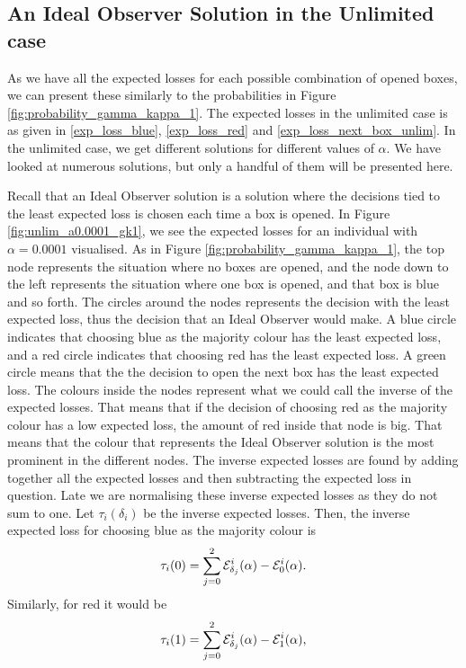 \subsection{An Ideal Observer Solution in the Unlimited case}

As we have all the expected losses for each possible combination of opened boxes, we can present these similarly to the probabilities in Figure \ref{fig:probability_gamma_kappa_1}. 
The expected losses in the unlimited case is as given in \eqref{exp_loss_blue}, \eqref{exp_loss_red} and \eqref{exp_loss_next_box_unlim}. In the unlimited case, we get different solutions for different values of $\alpha$. We have looked at numerous solutions, but only a handful of them will be presented here. 

Recall that an Ideal Observer solution is a solution where the decisions tied to the least expected loss is chosen each time a box is opened. In Figure \ref{fig:unlim_a0.0001_gk1}, we see the expected losses for an individual with $\alpha=0.0001$ visualised. As in Figure \ref{fig:probability_gamma_kappa_1}, the top node represents the situation where no boxes are opened, and the node down to the left represents the situation where one box is opened, and that box is blue and so forth. The circles around the nodes represents the decision with the least expected loss, thus the decision that an Ideal Observer would make. A blue circle indicates that choosing blue as the majority colour has the least expected loss, and a red circle indicates that choosing red has the least expected loss. A green circle means that the the decision to open the next box has the least expected loss. The colours inside the nodes represent what we could call the inverse of the expected losses. That means that if the decision of choosing red as the majority colour has a low expected loss, the amount of red inside that node is big. That means that the colour that represents the Ideal Observer solution is the most prominent in the different nodes. The inverse expected losses are found by adding together all the expected losses and then subtracting the expected loss in question. Late we are normalising these inverse expected losses as they do not sum to one. Let $\tau_i(\delta_i)$ be the inverse expected losses. Then, the inverse expected loss for choosing blue as the majority colour is 
\begin{equation*}
    \tau_i(0) = \sum_{j=0}^2 \mathcal{E}_{\delta_j}^i(\alpha) - \mathcal{E}_0^i(\alpha).
\end{equation*}
Similarly, for red it would be
\begin{equation*}
    \tau_i(1) = \sum_{j=0}^2 \mathcal{E}_{\delta_j}^i(\alpha) - \mathcal{E}_1^i(\alpha),
\end{equation*}
